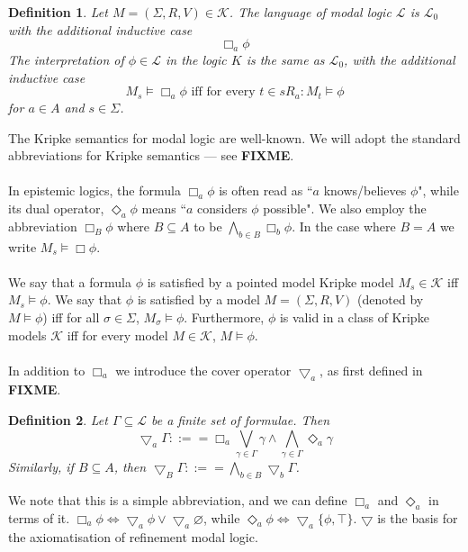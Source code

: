 \documentclass[12pt, a4paper, titlepage]{article}
\newtheorem{defn}{Definition}[subsection]
\numberwithin{equation}{section}
\newcommand{\cover}{\bigtriangledown}
\newcommand{\lang}{\mathcal{L}}
\newcommand{\langProp}{\lang_0}
\newcommand{\kripkeClass}{\mathcal{K}}
\newcommand{\FIXME}{{\bf FIXME}}
\begin{document}
\begin{defn} \label{modalLogic}
Let $M = (\Sigma, R, V) \in \kripkeClass$.
The language of modal logic $\lang$ is $\langProp$ with the additional inductive case
\[
	 \Box_a \phi
\]
The interpretation of $\phi \in \lang$ in the logic $K$ is the same as $\langProp$, with the
additional inductive case
\[
	M_s \models \Box_a \phi \text{ iff for every }t \in s R_a: M_t \models \phi
\]
for $a \in A$ and $s \in \Sigma$.
\end{defn}
The Kripke semantics for modal logic are well-known.
We will adopt the standard abbreviations for Kripke semantics --- see \FIXME.\\
\\
In epistemic logics, the formula $\Box_a \phi$ is often read as ``$a$ knows/believes $\phi$", while
its dual operator, $\Diamond_a \phi$ means ``$a$ considers $\phi$ possible".
We also employ the abbreviation $\Box_B \phi$ where $B \subseteq A$ to be $\bigwedge_{b \in B}
\Box_b \phi$.
In the case where $B = A$ we write $M_s \models \Box \phi$.\\
\\
We say that a formula $\phi$ is satisfied by a pointed model Kripke model $M_s \in \kripkeClass$ iff
$M_s \models \phi$.
We say that $\phi$ is satisfied by a model $M = (\Sigma, R, V)$ (denoted by $M \models \phi$) iff
for all $\sigma \in \Sigma$, $M_\sigma \models \phi$.
Furthermore, $\phi$ is valid in a class of Kripke models $\kripkeClass$ iff for every model $M \in
\kripkeClass$, $M \models \phi$.\\
\\
In addition to $\Box_a$ we introduce the cover operator $\cover_a$, as first defined in \FIXME.
\begin{defn} \label{coverDef}
Let $\Gamma \subseteq \lang$ be a finite set of formulae.
Then
\[
  \cover_a \Gamma ::== \Box_a \bigvee_{\gamma \in \Gamma} \gamma \land
  \bigwedge_{\gamma \in \Gamma} \Diamond_a \gamma
\]
Similarly, if $B \subseteq A$, then $\cover_B \Gamma ::== \bigwedge_{b \in B}
\cover_b \Gamma$.
\end{defn}
We note that this is a simple abbreviation, and we can define $\Box_a$ and
$\Diamond_a$ in terms of it.
$\Box_a \phi \iff \cover_a \phi \lor \cover_a \varnothing$, while $\Diamond_a
\phi \iff \cover_a \{\phi, \top\}$.
$\cover$ is the basis for the axiomatisation of refinement modal logic.
\end{document}

